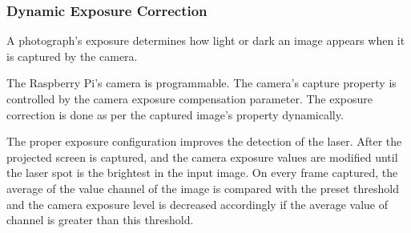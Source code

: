 \documentclass[12pt, a4paper]{article}
\begin{document}
	\subsubsection{Dynamic Exposure Correction}
	A photograph's exposure determines how light or dark an image appears when it is captured by the camera. 
	
	The Raspberry Pi's camera is programmable. The camera's capture property is controlled by the camera exposure compensation parameter. The exposure correction is done as per the captured image's property dynamically. 
	
	The proper exposure configuration improves the detection of the laser. After the projected screen is captured, and the camera exposure values are modified until the laser spot is the brightest in the input image. On every frame captured, the average of the value channel of the image is compared with the preset threshold and the camera exposure level is decreased accordingly if the average value of channel is greater than this threshold.
	
	
\end{document}
